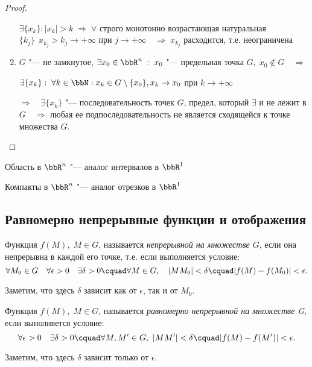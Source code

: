 \begin{proof}
\begin{enumerate}[wide, labelwidth=!, labelindent=\parindent]
$\exists \{ x_k \}: |x_k| > k \; \Rightarrow \; \forall$ строго монотонно возрастающая натуральная $\{ k_j \}\ \  x_{k_j} > k_j \to +\infty$ при $j \to +\infty \quad \Rightarrow \; x_{k_j}$ расходится, т.е. неограничена 

\item

$G$ "--- не замкнутое, $\exists x_0 \in \bbR^n \;:\; x_0$ "--- предельная точка $G, \; x_0 \notin G \quad \Rightarrow$

$\exists \{ x_k \}: \; \forall k \in \bbN: x_k \in G \setminus \{ x_0 \}, x_k \to x_0$ при $k \to +\infty$

$\Rightarrow \quad \exists \{ x_k \}$ "--- последовательность точек $G$, предел, который $\exists$ и не лежит в $G \quad \Rightarrow$  любая ее подпоследовательность не является сходящейся к точке множества $G$.\qedhere
\end{enumerate}
\end{proof}
Область в $\bbR^n$ "--- аналог интервалов в $\bbR^1$

Компакты в $\bbR^n$ "--- аналог отрезков в $\bbR^1$



\subsection{Равномерно непрерывные функции и отображения}

\begin{defn}
Функция $f(M),\;M\in G$, называется \textit{непрерывной на множестве $G$}, если она непрерывна в каждой его точке, т.е. если выполняется условие:
\begin{equation}\label{yaa45e1}
\forall M_0\in G\quad \forall\epsilon>0 \quad \exists\delta>0\cquad\forall M\in G,\quad |MM_0|<\delta\cquad|f(M)-f(M_0)|<\epsilon.
\end{equation}
\end{defn}
Заметим, что здесь $\delta$ зависит как от $\epsilon$, так и от $M_0$.

\begin{defn}
Функция $f(M),\; M\in G$, называется \textit{равномерно непрерывной на множестве G}, если выполняется условие:
\begin{equation}\label{yaa45e2}
\forall\epsilon>0\quad\exists\delta>0\cquad\forall M, M'\in G,\ |MM'|<\delta\cquad |f(M)-f(M')|<\epsilon.
\end{equation}
\end{defn}
Заметим, что здесь $\delta$ зависит только от $\epsilon$.

